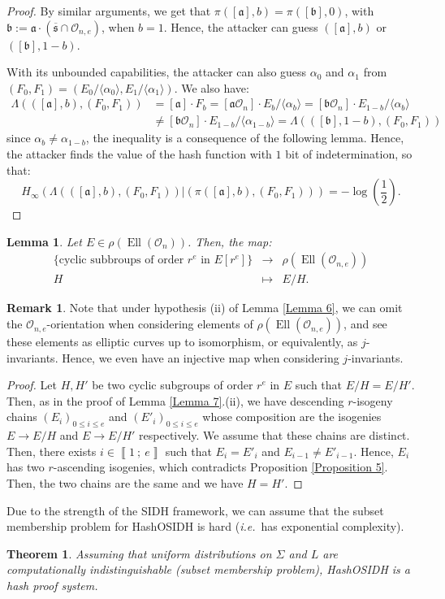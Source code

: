 \documentclass[a4paper,10pt]{report}
\theoremstyle{definition}
\theoremstyle{plain}
\newtheorem{Lemma}[Definition]{Lemma}
\newtheorem{Theorem}[Definition]{Theorem}
\theoremstyle{definition}
\newtheorem{Remark}[Definition]{Remark}
\newcommand{\ie}{\emph{i.e.}\ }
\newcommand{\mO}{\mathcal{O}}
\renewcommand{\i}[2]{\left\llbracket #1~;~#2\right\rrbracket}
\renewcommand{\(}{\left(}
\renewcommand{\)}{\right)}
\newcommand{\mf}[1]{\mathfrak{#1}}
\DeclareMathOperator{\Ell}{Ell}
\begin{document}
\begin{proof}
By similar arguments, we get that $\pi([\mf{a}],b)=\pi([\mf{b}],0)$, with $\mf{b}:=\mf{a}\cdot(\overline{\mf{s}}\cap\mO_{n,e})$, when $b=1$. Hence, the attacker can guess $([\mf{a}],b)$ or $([\mf{b}],1-b)$.

With its unbounded capabilities, the attacker can also guess $\alpha_0$ and $\alpha_1$ from $(F_0,F_1)=(E_0/\langle\alpha_0\rangle, E_1/\langle\alpha_1\rangle)$.  We also have:
\begin{align*}\Lambda(([\mf{a}],b),(F_0,F_1))&=[\mf{a}]\cdot F_b=[\mf{a}\mO_n]\cdot E_b/\langle\alpha_b\rangle=[\mf{b}\mO_n]\cdot E_{1-b}/\langle\alpha_b\rangle\\
&\neq [\mf{b}\mO_n]\cdot E_{1-b}/\langle\alpha_{1-b}\rangle=\Lambda(([\mf{b}],1-b),(F_0,F_1))
\end{align*}
since $\alpha_b\neq\alpha_{1-b}$, the inequality is a consequence of the following lemma. Hence, the attacker finds the value of the hash function with $1$ bit of indetermination, so that:
\[H_\infty(\Lambda(([\mf{a}],b),(F_0,F_1))|(\pi([\mf{a}],b),(F_0,F_1)))=-\log\(\frac{1}{2}\).\]
\end{proof}

\begin{Lemma}
Let $E\in \rho(\Ell(\mO_n))$. Then, the map:
\[\begin{array}{rcl}
\{\mbox{cyclic subbroups of order } r^e \mbox{ in } E[r^e]\}& \longrightarrow & \rho(\Ell(\mO_{n,e}))\\
H & \longmapsto & E/H.
\end{array}\]
\end{Lemma}

\begin{Remark}
Note that under hypothesis (ii) of Lemma \ref{Lemma 6},  we can omit the $\mO_{n,e}$-orientation when considering elements of $\rho(\Ell(\mO_{n,e}))$, and see these elements as elliptic curves up to isomorphism, or equivalently, as $j$-invariants.  Hence, we even have an injective map when considering $j$-invariants.
\end{Remark}

\begin{proof}
Let $H, H'$ be two cyclic subgroups of order $r^e$ in $E$ such that $E/H=E/H'$. Then, as in the proof of Lemma \ref{Lemma 7}.(ii), we have descending $r$-isogeny chains $(E_i)_{0\leq i\leq e}$ and $(E'_i)_{0\leq i\leq e}$ whose composition are the isogenies $E\longrightarrow E/H$ and $E\longrightarrow E/H'$ respectively. We assume that these chains are distinct. Then, there exists $i\in\i{1}{e}$ such that $E_i=E'_i$ and $E_{i-1}\neq E'_{i-1}$. Hence, $E_i$ has two $r$-ascending isogenies, which contradicts Proposition \ref{Proposition 5}. Then, the two chains are the same and we have $H=H'$.
\end{proof}

Due to the strength of the SIDH framework, we can assume that the subset membership problem for HashOSIDH is hard (\ie has exponential complexity).

\begin{Theorem}
Assuming that uniform distributions on $\Sigma$ and $L$ are computationally indistinguishable (subset membership problem), HashOSIDH is a hash proof system.
\end{Theorem}
\end{document}
